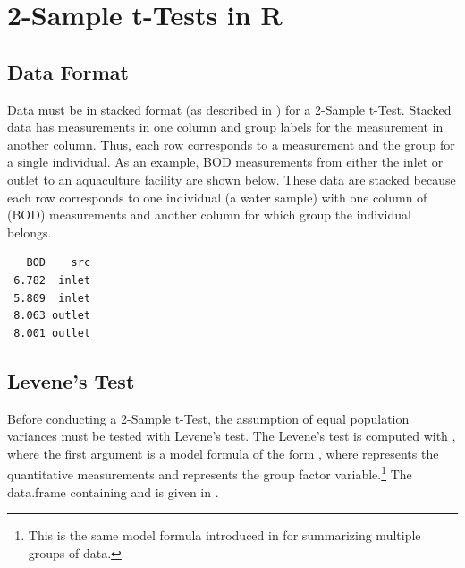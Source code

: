 \documentclass[10pt,openany]{book}\usepackage[]{graphicx}\usepackage[]{color}
\makeatletter
\newenvironment{kframe}{%
 \def\at@end@of@kframe{}%
 \ifinner\ifhmode%
  \def\at@end@of@kframe{\end{minipage}}%
  \begin{minipage}{\columnwidth}%
 \fi\fi%
 \def\FrameCommand##1{\hskip\@totalleftmargin \hskip-\fboxsep
 \colorbox{shadecolor}{##1}\hskip-\fboxsep
     \hskip-\linewidth \hskip-\@totalleftmargin \hskip\columnwidth}%
 \MakeFramed {\advance\hsize-\width
   \@totalleftmargin\z@ \linewidth\hsize
   \@setminipage}}%
 {\par\unskip\endMakeFramed%
 \at@end@of@kframe}
\newenvironment{knitrout}{}{} %
\makeatother
\begin{document}
\vspace*{12pt}
\section{2-Sample t-Tests in R}\label{sect:2tData}
\vspace*{-6pt}
\subsection{Data Format}
\vspace*{-4pt}
Data must be in stacked format (as described in ) for a 2-Sample t-Test. Stacked data has measurements in one column and group labels for the measurement in another column. Thus, each row corresponds to a measurement and the group for a single individual. As an example, BOD measurements from either the inlet or outlet to an aquaculture facility are shown below. These data are stacked because each row corresponds to one individual (a water sample) with one column of (BOD) measurements and another column for which group the individual belongs.
\vspace*{-4pt}
\begin{knitrout}
\color{fgcolor}\begin{kframe}
\begin{verbatim}
   BOD    src
 6.782  inlet
 5.809  inlet
 8.063 outlet
 8.001 outlet
\end{verbatim}
\end{kframe}
\end{knitrout}

\vspace*{-8pt}
\subsection{Levene's Test}
\vspace*{-4pt}
Before conducting a 2-Sample t-Test, the assumption of equal population variances must be tested with Levene's test. The Levene's test is computed with , where the first argument is a model formula of the form , where  represents the quantitative measurements and  represents the group factor variable.\footnote{This is the same model formula introduced in  for summarizing multiple groups of data.} The data.frame containing  and  is given in .

\vspace*{-8pt}
\end{document}
